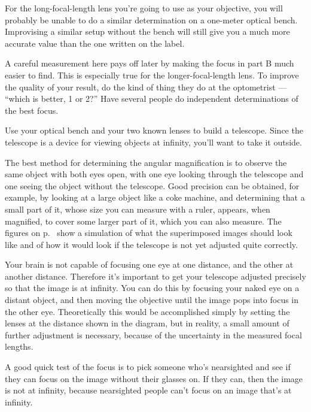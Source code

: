 For the long-focal-length lens you're going to use as your objective, you will
probably be unable to do a similar determination on a one-meter optical bench.
Improvising a similar setup without the bench will still give you a much more
accurate value than the one written on the label.

A careful measurement here pays off later by making the focus in part B much
easier to find. This is especially true for the longer-focal-length lens.
To improve the quality of your result, do the kind of thing they do at the
optometrist --- ``which is better, 1 or 2?'' Have several people do independent
determinations of the best focus.


Use your optical bench and your two known lenses to build a
telescope.
 Since the telescope is a device for viewing objects
at infinity, you'll want to take it outside.

The best method for determining the angular magnification
is to observe the same object with both eyes open, with one
eye looking through the telescope and one seeing the object
without the telescope. Good precision can be obtained, for
example, by looking at a large object like a coke machine,
and determining that a small part of it, whose size you
can measure with a ruler, appears, when magnified, to cover some larger part
of it, which you can also measure. The figures on p.~\pageref{fig:telescope-terrier}
show a simulation of what the superimposed images should look like and of
how it would look if the telescope is not yet adjusted quite correctly.

Your brain is not capable of focusing one eye at one distance, and
the other at another distance. Therefore it's important to get your
telescope adjusted precisely so that the image is at infinity.
You can do this by focusing your naked eye on a distant object, and
then moving the objective until the image pops into focus in the
other eye. Theoretically this would be accomplished simply by setting
the lenses at the distance shown in the diagram, but in reality,
a small amount of further adjustment is necessary, because of the
uncertainty in the measured focal lengths.

A good quick test of the focus is to pick someone who's nearsighted
and see if they can focus on the image without their glasses on.
If they can, then the image is not at infinity, because nearsighted
people can't focus on an image that's at infinity.

\prelab

